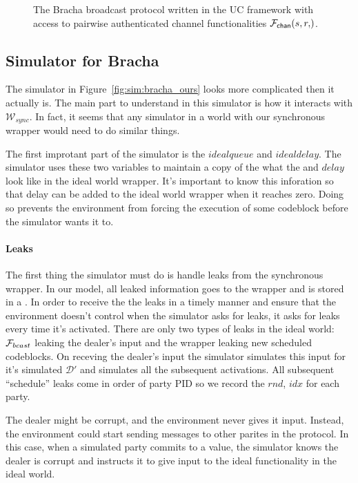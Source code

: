 \begin{figure}[!htb]
	
	\caption{The Bracha broadcast protocol written in the UC framework with access to pairwise authenticated channel functionalities $\Fchan{s,r}$.}
	\label{fig:prot:bracha_ours}
\end{figure}

\subsection{Simulator for Bracha}
The simulator in Figure~\ref{fig:sim:bracha_ours} looks more complicated then it actually is.
The main part to understand in this simulator is how it interacts with $\mathcal{W}_{sync}$.
In fact, it seems that any simulator in a world with our synchronous wrapper would need to do similar things.

The first improtant part of the simulator is the $idealqueue$ and $idealdelay$.
The simulator uses these two variables to maintain a copy of the what the  and $delay$ look like in the ideal world wrapper.
It's important to know this inforation so that delay can be added to the ideal world wrapper when it reaches zero. 
Doing so prevents the environment from forcing the execution of some codeblock before the simulator wants it to.

\paragraph{Leaks}
The first thing the simulator must do is handle leaks from the synchronous wrapper. 
In our model, all leaked information goes to the wrapper and is stored in a .
In order to receive the the leaks in a timely manner and ensure that the environment doesn't control when the simulator asks for leaks, it asks for leaks every time it's activated. 
There are only two types of leaks in the ideal world: $\mathcal{F}_{bcast}$ leaking the dealer's input and the wrapper leaking new scheduled codeblocks.
On receving the dealer's input the simulator simulates this input for it's simulated $\mathcal{D}'$ and simulates all the subsequent activations.
All subsequent ``schedule'' leaks come in order of party PID so we record the $rnd$, $idx$ for each party.

The dealer might be corrupt, and the environment never gives it input. 
Instead, the environment could start sending messages to other parites in the protocol. 
In this case, when a simulated party commits to a value, the simulator knows the dealer is corrupt and instructs it to give input to the ideal functionality in the ideal world.

